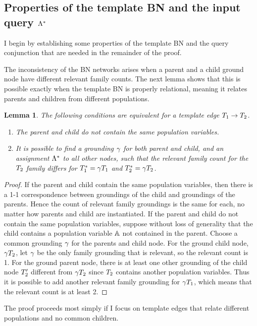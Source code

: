 \documentclass{sfuthesis}
\newtheorem{lemma}{Lemma}
\begin{document}
\begin{appendices}
\subsection{Properties of the template BN and the input query $\Lambda^{*}\hspace{0.0ex}$}
I  begin by establishing some properties of the template BN and the query conjunction that are needed in the remainder of the proof.
%


The inconsistency of the BN networks arises when a parent and a child ground node have different relevant family counts. The next lemma shows that this is possible exactly when the template BN is properly relational, meaning it relates parents and children from different populations.

\begin{lemma} \label{lemma:grounding} The following conditions are equivalent for a template edge $T_{1} \rightarrow T_{2}$.
\begin{enumerate}
\item The parent and child do not contain the same population variables.
\item It is possible to find a grounding $\gamma$ for both parent and child, and an assignment $\Lambda^{*}\hspace{0.0ex}$ to all other nodes, such that the relevant family count for the $T_{2}$ family differs for $T_{1}^{*}\hspace{0.0ex} = \gamma T_{1}$ 
and $T_{2}^{*}\hspace{0.0ex} = \gamma T_{2}$.
\end{enumerate}
\end{lemma}

\begin{proof}
If the parent and child contain the same population variables, then there is a 1-1 correspondence between groundings of the child and groundings of the parents. Hence the count of relevant family groundings is the same for each, no matter how parents and child are instantiated. If the parent and child do not contain the same population variables, suppose without loss of generality that the child contains a population variable $\mathbb{A}$ not contained in the parent. Choose a common grounding $\gamma$ for the parents and child node. For the ground child node, $\gamma T_{2}$, let $\gamma$ be the only family grounding that is relevant, so the relevant count is 1. For the  ground parent node, there is at least one other grounding of the child node $T_{2}'$ different from $\gamma T_{2}$ since $T_{2}$ contains another population variables. Thus it is possible to add another relevant family grounding for $\gamma T_{1}$, which means that the relevant count is at least 2. 
\end{proof}
The proof proceeds most simply if I  focus on template edges that relate different populations and no common children.


\end{appendices}
\end{document}
